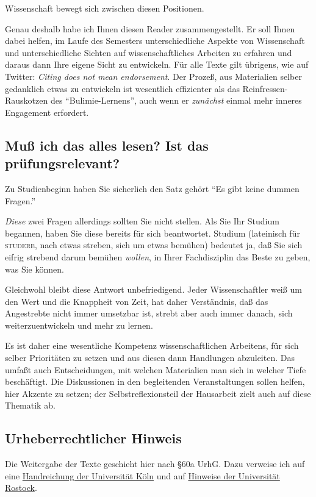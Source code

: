 Wissenschaft bewegt sich zwischen diesen Positionen.

Genau deshalb habe ich
Ihnen diesen Reader zusammengestellt. 
Er soll Ihnen dabei helfen, im Laufe des Semesters unterschiedliche
Aspekte von 
Wissenschaft und unterschiedliche Sichten auf wissenschaftliches
Arbeiten zu erfahren und daraus dann Ihre eigene Sicht zu entwickeln.
Für alle Texte gilt übrigens, wie auf Twitter: \textit{Citing does not mean endorsement}.
Der Prozeß, aus Materialien selber gedanklich etwas zu entwickeln ist wesentlich effizienter
als das Reinfressen-Rauskotzen des \enquote{Bulimie-Lernens}, auch wenn er \textit{zunächst} einmal mehr
inneres Engagement erfordert.

\subsection*{Muß ich das alles lesen? Ist das prüfungsrelevant?}

Zu Studienbeginn haben Sie sicherlich den Satz gehört \enquote{Es gibt keine dummen Fragen.}

\textit{Diese} zwei Fragen allerdings sollten Sie nicht stellen. Als  Sie Ihr Studium begannen,
haben Sie diese bereits für sich beantwortet.
Studium (lateinisch für \textsc{studere}, nach etwas streben, sich um etwas bemühen)
bedeutet ja, daß Sie sich eifrig strebend darum bemühen \textit{wollen}, in Ihrer Fachdisziplin das
Beste zu geben, was Sie können. 

Gleichwohl bleibt diese Antwort unbefriedigend. Jeder Wissenschaftler weiß um den Wert
und die Knappheit von Zeit, hat daher Verständnis, daß das Angestrebte nicht
immer umsetzbar ist, strebt aber auch immer danach, sich weiterzuentwickeln
und mehr zu lernen. 

Es ist daher eine wesentliche Kompetenz wissenschaftlichen Arbeitens, für sich selber Prioritäten zu
setzen und aus diesen dann Handlungen abzuleiten. Das umfaßt auch Entscheidungen, mit welchen
Materialien man sich in welcher Tiefe beschäftigt.
Die Diskussionen in den begleitenden Veranstaltungen sollen helfen,
hier Akzente zu setzen; der Selbstreflexionsteil der Hausarbeit zielt auch auf diese Thematik ab.

\subsection*{Urheberrechtlicher Hinweis}

Die Weitergabe der Texte geschieht hier nach \S 60a UrhG. Dazu verweise ich auf eine
\href{https://www.ub.uni-koeln.de/USB/ilias/e-sem.pdf}{Handreichung der Universität
Köln} und auf \href{https://www.ub.uni-rostock.de/lernen-arbeiten/wissenschaftliches-arbeiten/urheberrecht/}{Hinweise der Universität Rostock}.

